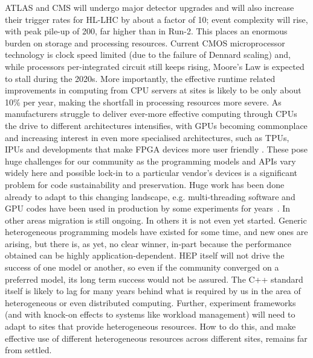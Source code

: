 ATLAS and CMS will undergo major detector upgrades and will also
increase their trigger rates for HL-LHC by about a factor of 10; event
complexity will rise, with peak pile-up of 200, far higher than in
Run-2. This places an enormous burden on storage and processing
resources. Current CMOS microprocessor technology is clock speed limited
(due to the failure of Dennard scaling) and, while processors
per-integrated circuit still keeps rising, Moore's Law is expected to
stall during the 2020s. More importantly, the effective runtime related
improvements in computing from CPU servers at sites is likely to be only
about 10\% per year, making the shortfall in processing resources more
severe. As manufacturers struggle to deliver ever-more effective
computing through CPUs the drive to different architectures intensifies,
with GPUs becoming commonplace and increasing interest in even more
specialised architectures, such as TPUs, IPUs and developments that make
FPGA devices more user friendly \cite{acm10.1145/3282307}.
These pose huge challenges for our
community as the programming models and APIs vary widely here and
possible lock-in to a particular vendor's devices is a significant
problem for code sustainability and preservation. Huge work has been
done already to adapt to this changing landscape, e.g. multi-threading
software and GPU codes have been used in production by some experiments
for years~\cite{calafiura2018hep, albrecht2018hepexec}.
In other areas migration is still ongoing. In others it is
not even yet started. Generic heterogeneous programming models have
existed for some time, and new ones are arising, but there is, as yet,
no clear winner, in-part because the performance obtained can be highly
application-dependent. HEP itself will not drive the success of one
model or another, so even if the community converged on a preferred
model, its long term success would not be assured. The C++ standard
itself is likely to lag for many years behind what is required by us in
the area of heterogeneous or even distributed computing. Further,
experiment frameworks (and with knock-on effects to systems like
workload management) will need to adapt to sites that provide
heterogeneous resources. How to do this, and make effective use of
different heterogeneous resources across different sites, remains far
from settled.

